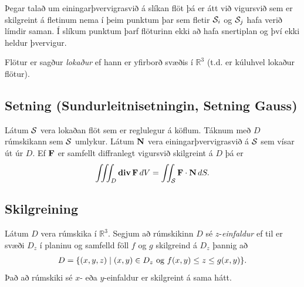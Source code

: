 \documentclass[a4paper,10pt,icelandic]{sphinxmanual}
\begin{document}
Þegar talað um einingarþvervigrasvið á slíkan flöt þá er átt við
vigursvið sem er skilgreint á fletinum nema í þeim punktum þar sem
fletir \({\cal S}_i\) og \({\cal S}_j\) hafa verið límdir saman.
Í slíkum punktum þarf flöturinn ekki að hafa snertiplan og því ekki
heldur þvervigur.

Flötur er sagður \emph{lokaður} ef hann er yfirborð svæðis í
\({\mathbb  R}^3\) (t.d. er kúluhvel lokaður flötur).


\subsection{Setning (Sundurleitnisetningin, Setning Gauss)}
\label{Kafli6:setning-sundurleitnisetningin-setning-gauss}
Látum \(\cal S\) vera lokaðan flöt sem er reglulegur á köflum.
Táknum með \(D\) rúmskikann sem \(\cal S\) umlykur. Látum
\(\mbox{${\bf N}$}\) vera einingarþvervigrasvið á \(\cal S\) sem
vísar út úr \(D\). Ef \(\mbox{${\bf F}$}\) er samfellt
diffranlegt vigursvið skilgreint á \(D\) þá er
\begin{gather}
\begin{split}\displaystyle \int\!\!\!\int\!\!\!\int_D \mbox{${\rm\bf div\,}$}\mbox{${\bf F}$}\,dV=\int\!\!\!\int_{\cal S} \mbox{${\bf F}$}\cdot\mbox{${\bf N}$}\,dS.\end{split}\notag
\end{gather}

\subsection{Skilgreining}
\label{Kafli6:id9}
Látum \(D\) vera rúmskika í \({\mathbb  R}^3\). Segjum að
rúmskikinn \(D\) sé \(z\)-\emph{einfaldur} ef til er svæði
\(D_z\) í planinu og samfelld föll \(f\) og \(g\) skilgreind
á \(D_z\) þannig að
\begin{gather}
\begin{split}\displaystyle D=\{(x,y,z)\mid (x,y)\in D_z\mbox{ og }f(x,y)\leq z\leq g(x,y)\}.\end{split}\notag
\end{gather}
Það að rúmskiki sé \(x\)- eða \(y\)-einfaldur er skilgreint á
sama hátt.
\end{document}
